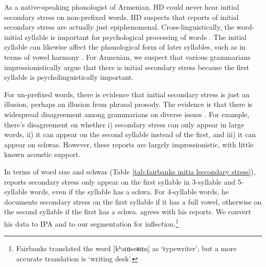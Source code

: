 As a native-speaking phonologist of Armenian, HD  could never hear initial secondary stress on non-prefixed words. HD suspects that reports of initial secondary stress are actually just epiphenomenal. Cross-linguistically, the  word-initial syllable is important for psychological processing of words \citep{BeckerVeinsLevine-2012-AsymmetriesInitialSyllableGeneralization}. The initial syllable can likewise affect the phonological form of later syllables, such as in terms of vowel harmony \citep{Beckman-1997-PositionalFaithfulness}. For Armenian, we suspect that various grammarians impressionistically argue that there is initial secondary stress because the first syllable is psycholinguistically important. 

For un-prefixed words, there is evidence that initial secondary stress is just an illusion, perhaps an illusion from phrasal prosody.  The evidence is that there is widespread disagreement among grammarians on diverse issues \citep{Fairbanks-1948-PhonologyMorphoWestern,Johnson-1954-EastArmGrammar,Gharagulyan-1974-BookArmenianOrthoepy,Margaryan-1997-ArmenianPhonology,Soukyasyan-2004-ArmenianPhonology,Tokhmakhyan-1971-ArmenianWordStress,Tokhmakhyan-1975-StressEssence,Tokhmakhyan-1983-ArmenianPhono}. For example, there's disagreement on whether  i)  secondary stress can only appear in large words, ii) it can appear on the second syllable instead of the first, and iii) it can appear on schwas.    However, these reports are largely impressionistic, with little known acoustic support. 



In terms of word size and schwas (Table \ref{tab:fairbanks initia lsecondary stress}), \citet[12]{Fairbanks-1948-PhonologyMorphoWestern} reports secondary stress only appear on the first syllable in 3-syllable and 5-syllable words, even if the syllable has a schwa. For 4-syllable words, he documents secondary stress on the first syllable if it has a full vowel, otherwise on the second syllable if the first has a schwa. \citet{Kassabian-1971-ContrastStressWesttArmEnglish} agrees with his reports. We convert his data to IPA and to our   segmentation for inflection.\footnote{Fairbanks translated the word [{kʰəɾɑse{ʁɑn}}] as `typewriter', but a more accurate translation is `writing desk'. } 

